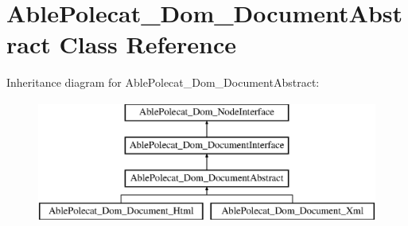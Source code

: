 \hypertarget{class_able_polecat___dom___document_abstract}{}\section{Able\+Polecat\+\_\+\+Dom\+\_\+\+Document\+Abstract Class Reference}
\label{class_able_polecat___dom___document_abstract}
Inheritance diagram for Able\+Polecat\+\_\+\+Dom\+\_\+\+Document\+Abstract\+:\begin{figure}[H]
\begin{center}
\leavevmode
\includegraphics[height=4.000000cm]{class_able_polecat___dom___document_abstract}
\end{center}
\end{figure}
